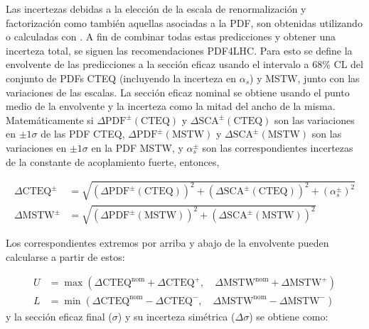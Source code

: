 \newcommand{\pdfcteqpm}{\ensuremath{\Delta\mathrm{PDF}^{\pm}(\mathrm{CTEQ})}}
\newcommand{\scacteqpm}{\ensuremath{\Delta\mathrm{SCA}^{\pm}(\mathrm{CTEQ})}}

\newcommand{\pdfmstwpm}{\ensuremath{\Delta\mathrm{PDF}^{\pm}(\mathrm{MSTW})}}
\newcommand{\scamstwpm}{\ensuremath{\Delta\mathrm{SCA}^{\pm}(\mathrm{MSTW})}}

\newcommand{\alphap}{\ensuremath{\alpha_s_+}}
\newcommand{\alpham}{\ensuremath{\alpha_s^-}}
\newcommand{\alphapm}{\ensuremath{\alpha_s^{\pm}}}

Las incertezas debidas a la elección de la escala de renormalización y
factorización como también aquellas asociadas a la PDF, son obtenidas utilizando {\nllfast} o
calculadas con {\prospino}. A fin de combinar todas estas predicciones y obtener
una incerteza total, se siguen las recomendaciones PDF4LHC\cite{Botje:2011sn}.
Para esto se define la envolvente de las predicciones a la sección eficaz usando
el intervalo a 68\% CL del conjunto de PDFs CTEQ (incluyendo la incerteza en
$\alpha_s$) y MSTW, junto con las variaciones de las escalas. La sección eficaz
nominal se obtiene usando el punto medio de la envolvente y la incerteza como la
mitad del ancho de la misma. Matemáticamente si {\pdfcteqpm} y {\scacteqpm} son
las variaciones en $\pm 1\sigma$ de las PDF CTEQ,  {\pdfmstwpm} y {\scamstwpm}
son las variaciones en $\pm 1\sigma$ en la PDF MSTW, y {\alphapm} son las
correspondientes incertezas de la constante de acoplamiento fuerte, entonces,

\begin{align}
  \Delta\mathrm{CTEQ}^{\pm} &= \sqrt{(\pdfcteqpm)^2 + (\scacteqpm)^2 + (\alphapm)^2} \\
  \Delta\mathrm{MSTW}^{\pm} &= \sqrt{(\pdfmstwpm)^2 + (\scamstwpm)^2}
\end{align}

Los correspondientes extremos por arriba y abajo de la envolvente pueden calcularse a partir de estos:

\begin{align}
  U &= \max(\Delta\mathrm{CTEQ}^\mathrm{nom} + \Delta\mathrm{CTEQ}^{+},\quad \Delta\mathrm{MSTW}^\mathrm{nom} + \Delta\mathrm{MSTW}^{+}) \\
  L &= \min(\Delta\mathrm{CTEQ}^\mathrm{nom} - \Delta\mathrm{CTEQ}^{-},\quad \Delta\mathrm{MSTW}^\mathrm{nom} - \Delta\mathrm{MSTW}^{-})
\end{align}
%
y la sección eficaz final ($\sigma$) y su incerteza simétrica ($\Delta\sigma$) se obtiene como:

